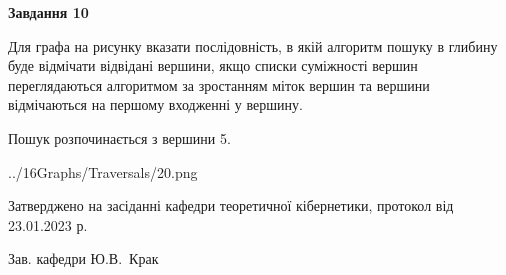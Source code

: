 \documentclass[12pt, ukrainian]{article}
\begin{document}
{\begin {large}
{\begin {center}\textbf{Завдання 10}\end {center}}\par
Для графа на рисунку вказати послідовність, в якій алгоритм пошуку в глибину буде відмічати відвідані вершини, якщо списки суміжності вершин переглядаються алгоритмом за зростанням міток вершин та вершини відмічаються на першому вход\-женні у вершину.\par
Пошук розпочинається з вершини 5.\par

\begin{center}
	{../16Graphs/Traversals/20.png}
\end{center}\par
\newpage


\end {large}
}
{\smallskip \begin {small} Затверджено на засіданні кафедри теоретичної кібернетики, протокол  від   23.01.2023 р.\par\smallskip\smallskip
{\parbox {6.5 cm}{Зав. кафедри \dotfill Ю.В.~Крак}} \end{small}}
\end{document}
